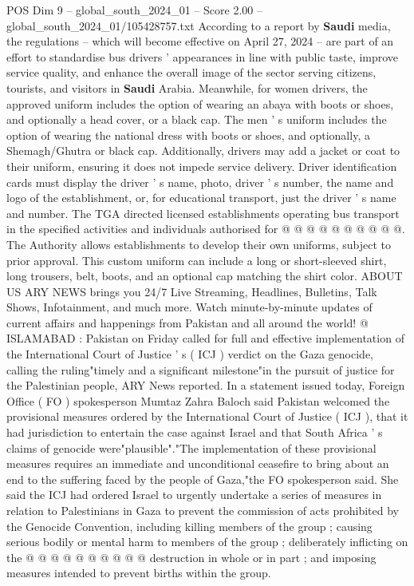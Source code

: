 \begin{textsample}{POS Dim 9 – global\_south\_2024\_01 – Score 2.00 – global\_south\_2024\_01/105428757.txt}  \label{ex:f9_pos_016}
According to a report by \textbf{Saudi} media, the regulations -- which will become effective on April 27, 2024 -- are part of an effort to standardise bus drivers ' appearances in line with public taste, improve service quality, and enhance the overall image of the sector serving citizens, tourists, and visitors in \textbf{Saudi} Arabia.
Meanwhile, for women drivers, the approved uniform includes the option of wearing an abaya with boots or shoes, and optionally a head cover, or a black cap.
The men ' s uniform includes the option of wearing the national dress with boots or shoes, and optionally, a Shemagh/Ghutra or black cap.
Additionally, drivers may add a jacket or coat to their uniform, ensuring it does not impede service delivery.
Driver identification cards must display the driver ' s name, photo, driver ' s number, the name and logo of the establishment, or, for educational transport, just the driver ' s name and number.
The TGA directed licensed establishments operating bus transport in the specified activities and individuals authorised for @ @ @ @ @ @ @ @ @ @.
The Authority allows establishments to develop their own uniforms, subject to prior approval.
This custom uniform can include a long or short-sleeved shirt, long trousers, belt, boots, and an optional cap matching the shirt color.
ABOUT US ARY NEWS brings you 24/7 Live Streaming, Headlines, Bulletins, Talk Shows, Infotainment, and much more.
Watch minute-by-minute updates of current affairs and happenings from Pakistan and all around the world! @ ISLAMABAD : Pakistan on Friday called for full and effective implementation of the International Court of Justice ' s ( ICJ ) verdict on the Gaza genocide, calling the ruling"timely and a significant milestone"in the pursuit of justice for the Palestinian people, ARY News reported.
In a statement issued today, Foreign Office ( FO ) spokesperson Mumtaz Zahra Baloch said Pakistan welcomed the provisional measures ordered by the International Court of Justice ( ICJ ), that it had jurisdiction to entertain the case against Israel and that South Africa ' s claims of genocide were"plausible"."The implementation of these provisional measures requires an immediate and unconditional ceasefire to bring about an end to the suffering faced by the people of Gaza,"the FO spokesperson said.
She said the ICJ had ordered Israel to urgently undertake a series of measures in relation to Palestinians in Gaza to prevent the commission of acts prohibited by the Genocide Convention, including killing members of the group ; causing serious bodily or mental harm to members of the group ; deliberately inflicting on the @ @ @ @ @ @ @ @ @ @ destruction in whole or in part ; and imposing measures intended to prevent births within the group.

\end{textsample}
